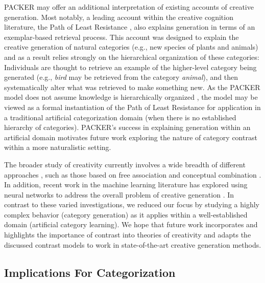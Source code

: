 \documentclass[pdflatex,sn-apa]{sn-jnl}%
\theoremstyle{thmstyleone}%
\theoremstyle{thmstyletwo}%
\theoremstyle{thmstylethree}%
\begin{document}
PACKER may offer an additional interpretation of existing accounts of creative
generation. Most notably, a leading account within the creative cognition
literature, the Path of Least Resistance \citep{ward1994structured,ward1995s},
also explains generation in terms of an exemplar-based retrieval process. This
account was designed to explain the creative generation of natural categories
(e.g., new species of plants and animals) and as a result relies strongly on the
hierarchical organization of these categories: Individuals are thought to
retrieve an example of the higher-level category being generated (e.g.,
\textit{bird} may be retrieved from the category \textit{animal}), and then
systematically alter what was retrieved to make something new. As the PACKER
model does not assume knowledge is hierarchically organized \citep[this is true
of the exemplar view more broadly, see][]{murphy2016exemplar}, the model may be
viewed as a formal instantiation of the Path of Least Resistance for application
in a traditional artificial categorization domain (when there is no established
hierarchy of categories). PACKER's success in explaining generation within an
artificial domain motivates future work exploring the nature of category
contrast within a more naturalistic setting.

The broader study of creativity currently involves a wide breadth of different
approaches \citep[for a review, see][]{kozbelt2010theories}, such as those based
on free association \citep{mednick1962associative} and conceptual combination
\citep{estes2002emergence,murphy1988comprehending}. In addition, recent work in
the machine learning literature has explored using neural networks to address
the overall problem of creative generation
\citep[e.g.,][]{goodfellow2014gan,ho2016gail,kingma2016,chen2016infogan}. In
contrast to these varied investigations, we reduced our focus by studying a
highly complex behavior (category generation) as it applies within a
well-established domain (artificial category learning). We hope that future work
incorporates and highlights the importance of contrast into theories of
creativity and adapts the discussed contrast models to work in state-of-the-art creative generation methods.

\subsection{Implications For Categorization}
\end{document}
